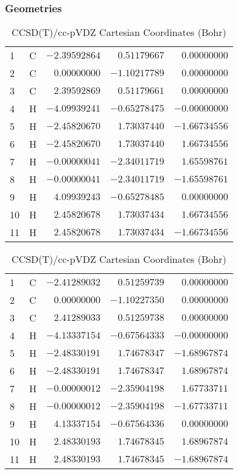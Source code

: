 \documentclass[10pt,oneside]{article}
\begin{document}
\begin{table}[h!]
\subsubsection*{Geometries}
\begin{multicols}{2}
\centering
\caption{CCSD(T)/cc-pVTZ Cartesian Coordinates (Bohr)}
\begin{tabular}{llrrr}
\toprule
1  & C  & $-2.39592864$ & $ 0.51179667$ & $ 0.00000000$ \\
2  & C  & $ 0.00000000$ & $-1.10217789$ & $ 0.00000000$ \\
3  & C  & $ 2.39592869$ & $ 0.51179661$ & $ 0.00000000$ \\
4  & H  & $-4.09939241$ & $-0.65278475$ & $-0.00000000$ \\
5  & H  & $-2.45820670$ & $ 1.73037440$ & $-1.66734556$ \\
6  & H  & $-2.45820670$ & $ 1.73037440$ & $ 1.66734556$ \\
7  & H  & $-0.00000041$ & $-2.34011719$ & $ 1.65598761$ \\
8  & H  & $-0.00000041$ & $-2.34011719$ & $-1.65598761$ \\
9  & H  & $ 4.09939243$ & $-0.65278485$ & $ 0.00000000$ \\
10 & H  & $ 2.45820678$ & $ 1.73037434$ & $ 1.66734556$ \\
11 & H  & $ 2.45820678$ & $ 1.73037434$ & $-1.66734556$ \\
\bottomrule
\end{tabular}
\caption{CCSD(T)/cc-pVDZ Cartesian Coordinates (Bohr)}
\begin{tabular}{llrrr}
\toprule
1  & C  & $-2.41289032$ & $ 0.51259739$ & $ 0.00000000$ \\
2  & C  & $ 0.00000000$ & $-1.10227350$ & $ 0.00000000$ \\
3  & C  & $ 2.41289033$ & $ 0.51259738$ & $ 0.00000000$ \\
4  & H  & $-4.13337154$ & $-0.67564333$ & $-0.00000000$ \\
5  & H  & $-2.48330191$ & $ 1.74678347$ & $-1.68967874$ \\
6  & H  & $-2.48330191$ & $ 1.74678347$ & $ 1.68967874$ \\
7  & H  & $-0.00000012$ & $-2.35904198$ & $ 1.67733711$ \\
8  & H  & $-0.00000012$ & $-2.35904198$ & $-1.67733711$ \\
9  & H  & $ 4.13337154$ & $-0.67564336$ & $ 0.00000000$ \\
10 & H  & $ 2.48330193$ & $ 1.74678345$ & $ 1.68967874$ \\
11 & H  & $ 2.48330193$ & $ 1.74678345$ & $-1.68967874$ \\
\bottomrule
\end{tabular}
\end{multicols}
\end{table}
\end{document}
